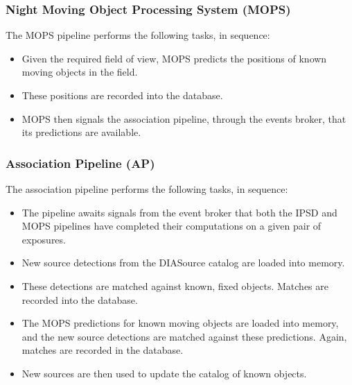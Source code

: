 \subsubsection{Night Moving Object Processing System (MOPS)}

The MOPS pipeline performs the following tasks, in sequence:

\begin{itemize}

\item Given the required field of view, MOPS predicts the positions 
of known moving objects in the field.

\item These positions are recorded into the database.

\item MOPS then signals the association pipeline, through the events
broker, that its predictions are available.

\end{itemize}

\subsubsection{Association Pipeline (AP)}

The association pipeline performs the following tasks, in sequence:

\begin{itemize}

\item The pipeline awaits signals from the event broker that
both the IPSD and MOPS pipelines have completed their computations
on a given pair of exposures.

\item New source detections from the DIASource catalog are loaded 
into memory.

\item These detections are matched against known, fixed objects.
Matches are recorded into the database.

\item The MOPS predictions for known moving objects are loaded 
into memory, and the new source detections are matched against
these predictions. Again, matches are recorded in the database.

\item New sources are then used to update the catalog of known
objects.

\end{itemize}

